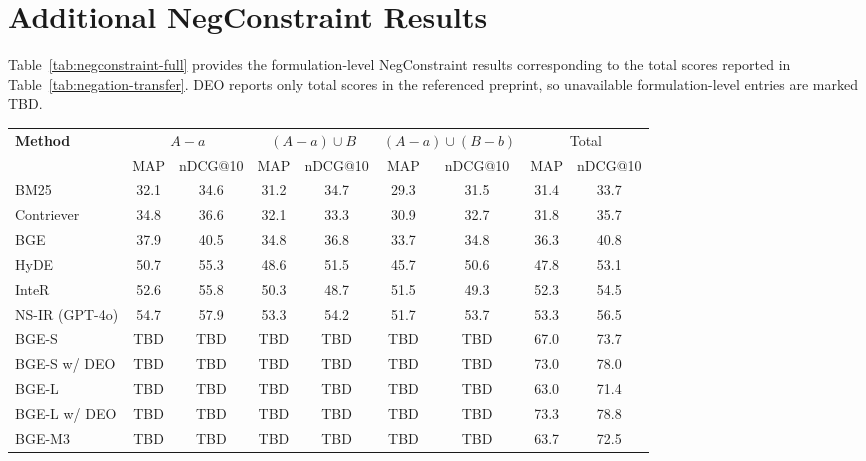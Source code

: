 \documentclass[letterpaper]{article}
\begin{document}
\section{Additional NegConstraint Results}
\label{app:negconstraint}

Table~\ref{tab:negconstraint-full} provides the formulation-level
NegConstraint results corresponding to the total scores reported in
Table~\ref{tab:negation-transfer}.  DEO reports only total scores in
the referenced preprint, so unavailable formulation-level entries are
marked \textnormal{TBD}.

\begin{table}[!t]
\centering
\small
\setlength{\tabcolsep}{3.4pt}
\begin{tabular}{lcc|cc|cc|cc}
\toprule
\multirow{2}{*}{\textbf{Method}}
& \multicolumn{2}{c|}{$A-a$}
& \multicolumn{2}{c|}{$(A-a)\cup B$}
& \multicolumn{2}{c|}{$(A-a)\cup(B-b)$}
& \multicolumn{2}{c}{Total} \\
\cmidrule(lr){2-3} \cmidrule(lr){4-5} \cmidrule(lr){6-7} \cmidrule(lr){8-9}
& MAP & nDCG@10 & MAP & nDCG@10 & MAP & nDCG@10 & MAP & nDCG@10 \\
\midrule
BM25 & 32.1 & 34.6 & 31.2 & 34.7 & 29.3 & 31.5 & 31.4 & 33.7 \\
Contriever & 34.8 & 36.6 & 32.1 & 33.3 & 30.9 & 32.7 & 31.8 & 35.7 \\
BGE & 37.9 & 40.5 & 34.8 & 36.8 & 33.7 & 34.8 & 36.3 & 40.8 \\
HyDE & 50.7 & 55.3 & 48.6 & 51.5 & 45.7 & 50.6 & 47.8 & 53.1 \\
InteR & 52.6 & 55.8 & 50.3 & 48.7 & 51.5 & 49.3 & 52.3 & 54.5 \\
NS-IR (GPT-4o) & 54.7 & 57.9 & 53.3 & 54.2 & 51.7 & 53.7 & 53.3 & 56.5 \\
\midrule
BGE-S & \textnormal{TBD} & \textnormal{TBD} & \textnormal{TBD} & \textnormal{TBD} & \textnormal{TBD} & \textnormal{TBD} & 67.0 & 73.7 \\
BGE-S w/ DEO & \textnormal{TBD} & \textnormal{TBD} & \textnormal{TBD} & \textnormal{TBD} & \textnormal{TBD} & \textnormal{TBD} & 73.0 & 78.0 \\
BGE-L & \textnormal{TBD} & \textnormal{TBD} & \textnormal{TBD} & \textnormal{TBD} & \textnormal{TBD} & \textnormal{TBD} & 63.0 & 71.4 \\
BGE-L w/ DEO & \textnormal{TBD} & \textnormal{TBD} & \textnormal{TBD} & \textnormal{TBD} & \textnormal{TBD} & \textnormal{TBD} & 73.3 & 78.8 \\
BGE-M3 & \textnormal{TBD} & \textnormal{TBD} & \textnormal{TBD} & \textnormal{TBD} & \textnormal{TBD} & \textnormal{TBD} & 63.7 & 72.5 \\

\end{tabular}
\end{table}
\end{document}
